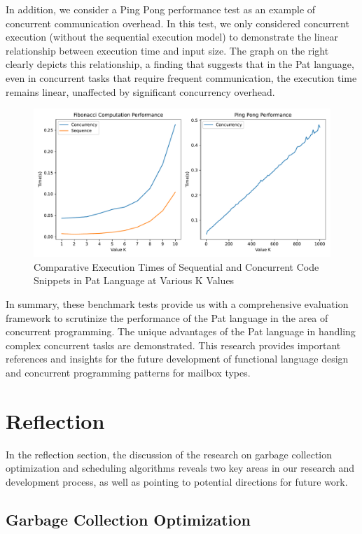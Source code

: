 \documentclass{l4proj}
\begin{document}
In addition, we consider a Ping Pong performance test as an example of concurrent communication overhead. In this test, we only considered concurrent execution (without the sequential execution model) to demonstrate the linear relationship between execution time and input size. The graph on the right clearly depicts this relationship, a finding that suggests that in the Pat language, even in concurrent tasks that require frequent communication, the execution time remains linear, unaffected by significant concurrency overhead.

\begin{figure}
    \centering
    \includegraphics[width=0.88\linewidth]{dissertation/images/benchmark.pdf}    
    \caption{ 
    Comparative Execution Times of Sequential and Concurrent Code Snippets in Pat Language at Various K Values
    }
    \label{fig:benchmark} 
\end{figure}

In summary, these benchmark tests provide us with a comprehensive evaluation framework to scrutinize the performance of the Pat language in the area of concurrent programming. The unique advantages of the Pat language in handling complex concurrent tasks are demonstrated. This research provides important references and insights for the future development of functional language design and concurrent programming patterns for mailbox types.

\section{Reflection}
In the reflection section, the discussion of the research on garbage collection optimization and scheduling algorithms reveals two key areas in our research and development process, as well as pointing to potential directions for future work.

\subsection{Garbage Collection Optimization}
\end{document}
